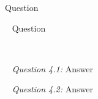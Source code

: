 \documentclass[12pt]{article}
\begin{document}
\date{}
\maketitle


\newline
Question

~\newline
{}
\newline
Question

~\newline


\pagebreak
{}

~\newline
\textit{Question 4.1:}
\newline
Answer

~\newline
\textit{Question 4.2:}
\newline
Answer

~\newline
\end{document}
